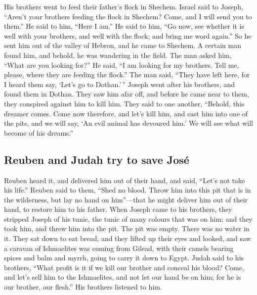  His brothers went to feed their father's flock in
Shechem.  Israel said to Joseph, ``Aren't your brothers
feeding the flock in Shechem? Come, and I will send you to them.'' He
said to him, ``Here I am.''  He said to him, ``Go now,
see whether it is well with your brothers, and well with the flock; and
bring me word again.'' So he sent him out of the valley of Hebron, and
he came to Shechem.  A certain man found him, and behold,
he was wandering in the field. The man asked him, ``What are you looking
for?''  He said, ``I am looking for my brothers. Tell me,
please, where they are feeding the flock.''  The man
said, ``They have left here, for I heard them say, `Let's go to
Dothan.'\,'' Joseph went after his brothers, and found them in Dothan.
 They saw him afar off, and before he came near to them,
they conspired against him to kill him.  They said to one
another, ``Behold, this dreamer comes.  Come now
therefore, and let's kill him, and cast him into one of the pits, and we
will say, `An evil animal has devoured him.' We will see what will
become of his dreams.''

\hypertarget{reuben-and-judah-try-to-save-josuxe9}{%
\subsection{Reuben and Judah try to save
José}\label{reuben-and-judah-try-to-save-josuxe9}}

 Reuben heard it, and delivered him out of their hand,
and said, ``Let's not take his life.''  Reuben said to
them, ``Shed no blood. Throw him into this pit that is in the
wilderness, but lay no hand on him''---that he might deliver him out of
their hand, to restore him to his father.  When Joseph
came to his brothers, they stripped Joseph of his tunic, the tunic of
many colours that was on him;  and they took him, and
threw him into the pit. The pit was empty. There was no water in it.
 They sat down to eat bread, and they lifted up their
eyes and looked, and saw a caravan of Ishmaelites was coming from
Gilead, with their camels bearing spices and balm and myrrh, going to
carry it down to Egypt.  Judah said to his brothers,
``What profit is it if we kill our brother and conceal his blood?
 Come, and let's sell him to the Ishmaelites, and not let
our hand be on him; for he is our brother, our flesh.'' His brothers
listened to him.


